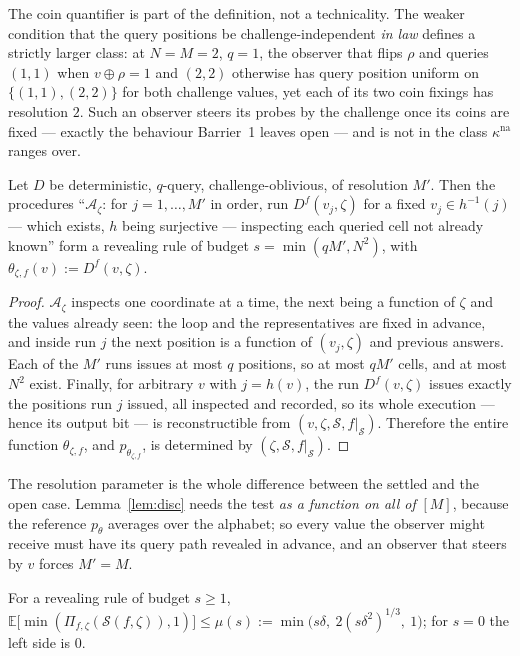 \documentclass{aicr-solution}
\newcommand{\Exp}{\mathbb{E}}
\newcommand{\kna}{\kappa^{\mathrm{na}}}
\begin{document}
The coin quantifier is part of the definition, not a technicality. The weaker
condition that the query positions be challenge-independent \emph{in law} defines
a strictly larger class: at $N=M=2$, $q=1$, the observer that flips $\rho$ and
queries $(1,1)$ when $v\oplus\rho=1$ and $(2,2)$ otherwise has query position
uniform on $\{(1,1),(2,2)\}$ for both challenge values, yet each of its two coin
fixings has resolution $2$. Such an observer steers its probes by the challenge
once its coins are fixed --- exactly the behaviour Barrier~1 leaves open --- and
is not in the class $\kna$ ranges over.

\begin{lemma}\label{lem:rr}
Let $D$ be deterministic, $q$-query, challenge-oblivious, of resolution $M'$.
Then the procedures ``$\mathcal A_\zeta$: for $j=1,\dots,M'$ in order, run
$D^{f}(v_j,\zeta)$ for a fixed $v_j\in h^{-1}(j)$ --- which exists, $h$ being
surjective --- inspecting each queried cell not already known'' form a revealing
rule of budget $s=\min(qM',N^{2})$, with $\theta_{\zeta,f}(v):=D^{f}(v,\zeta)$.
\end{lemma}

\begin{proof}
$\mathcal A_\zeta$ inspects one coordinate at a time, the next being a function
of $\zeta$ and the values already seen: the loop and the representatives are
fixed in advance, and inside run $j$ the next position is a function of
$(v_j,\zeta)$ and previous answers. Each of the $M'$ runs issues at most $q$
positions, so at most $qM'$ cells, and at most $N^{2}$ exist. Finally, for
arbitrary $v$ with $j=h(v)$, the run $D^{f}(v,\zeta)$ issues exactly the
positions run $j$ issued, all inspected and recorded, so its whole execution ---
hence its output bit --- is reconstructible from
$(v,\zeta,\mathcal S,f|_{\mathcal S})$. Therefore the entire function
$\theta_{\zeta,f}$, and $p_{\theta_{\zeta,f}}$, is determined by
$(\zeta,\mathcal S,f|_{\mathcal S})$.
\end{proof}

The resolution parameter is the whole difference between the settled and the open
case. Lemma~\ref{lem:disc} needs the test \emph{as a function on all of} $[M]$,
because the reference $p_\theta$ averages over the alphabet; so every value the
observer might receive must have its query path revealed in advance, and an
observer that steers by $v$ forces $M'=M$.

\begin{lemma}\label{lem:mass}
For a revealing rule of budget $s\ge1$,
$\Exp\bigl[\min(\Pi_{f,\zeta}(\mathcal S(f,\zeta)),1)\bigr]\le
\mu(s):=\min\bigl(s\delta,\ 2(s\delta^{2})^{1/3},\ 1\bigr)$; for $s=0$ the left
side is $0$.
\end{lemma}
\end{document}
